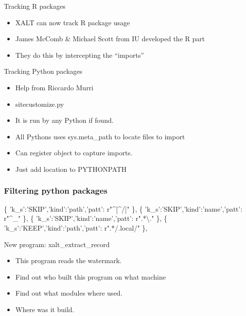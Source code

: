 \documentclass{beamer}
\begin{document}
\begin{frame}{Tracking R packages}
  \begin{itemize}
    \item XALT can now track R package usage
    \item James McComb \& Michael Scott from IU developed the R part
    \item They do this by intercepting the ``imports''
  \end{itemize}
\end{frame}

\begin{frame}{Tracking Python packages}
  \begin{itemize}
    \item Help from Riccardo Murri
    \item sitecustomize.py
    \item It is run by any Python if found.
    \item All Pythons uses sys.meta\_path to locate files to import
    \item Can register object to capture imports.
    \item Just add location to PYTHONPATH
  \end{itemize}
\end{frame}

\begin{frame}[fragile]
    \frametitle{Filtering python packages}
 {\small
    \begin{semiverbatim}
\{ 'k\_s':'SKIP','kind':'path','patt': r"^[^/]" \},
\{ 'k\_s':'SKIP','kind':'name','patt': r"^_"    \},
\{ 'k\_s':'SKIP','kind':'name','patt': r".*\textbackslash." \},
\{ 'k\_s':'KEEP','kind':'path','patt': r".*/.local/" \},
    \end{semiverbatim}
}
\end{frame}

\begin{frame}{New program: xalt\_extract\_record}
  \begin{itemize}
    \item This program reads the watermark.
    \item Find out who built this program on what machine
    \item Find out what modules where used.
    \item Where was it build. 
  \end{itemize}
\end{frame}
\end{document}

